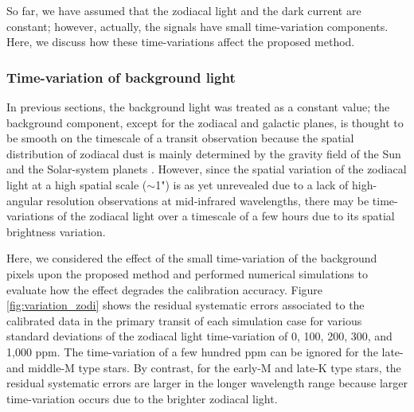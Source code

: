 \documentclass{aastex62}
\begin{document}
So far, we have assumed that the zodiacal light and the dark current are constant; however, actually, the signals have small time-variation components. Here, we discuss how these time-variations affect the proposed method.


\subsubsection{Time-variation of background light} \label{subsubsec:variation_zodi}

In previous sections, the background light was treated as a constant value; the background component, except for the zodiacal and galactic planes, is thought to be smooth on the timescale of a transit observation because the spatial distribution of zodiacal dust is mainly determined by the gravity field of the Sun and the Solar-system planets \citep{2016AJ....151...71K}. However, since the spatial variation of the zodiacal light at a high spatial scale ($\sim$1") is as yet unrevealed due to a lack of high-angular resolution observations at mid-infrared wavelengths, there may be time-variations of the zodiacal light over a timescale of a few hours due to its spatial brightness variation.

Here, we considered the effect of the small time-variation of the background pixels upon the proposed method and performed numerical simulations to evaluate how the effect degrades the calibration accuracy. Figure \ref{fig:variation_zodi} shows the residual systematic errors associated to the calibrated data in the primary transit of each simulation case for various standard deviations of the zodiacal light time-variation of 0, 100, 200, 300, and 1,000 ppm. The time-variation of a few hundred ppm can be ignored for the late- and middle-M type stars. By contrast, for the early-M and late-K type stars, the residual systematic errors are larger in the longer wavelength range because larger time-variation occurs due to the brighter zodiacal light.
\end{document}
